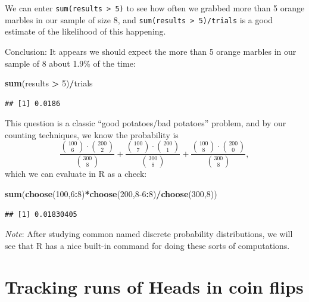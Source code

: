 \documentclass[
]{book}
\newenvironment{Shaded}{\begin{snugshade}}{\end{snugshade}}
\newcommand{\DecValTok}[1]{\textcolor[rgb]{0.00,0.00,0.81}{#1}}
\newcommand{\FunctionTok}[1]{\textcolor[rgb]{0.13,0.29,0.53}{\textbf{#1}}}
\newcommand{\NormalTok}[1]{#1}
\newcommand{\SpecialCharTok}[1]{\textcolor[rgb]{0.81,0.36,0.00}{\textbf{#1}}}
\theoremstyle{definition}
\theoremstyle{definition}
\theoremstyle{definition}
\theoremstyle{definition}
\theoremstyle{remark}
\begin{document}
We can enter \texttt{sum(results\ \textgreater{}\ 5)} to see how often we grabbed more than 5 orange marbles in our sample of size 8, and \texttt{sum(results\ \textgreater{}\ 5)/trials} is a good estimate of the likelihood of this happening.

Conclusion: It appears we should expect the more than 5 orange marbles in our sample of 8 about 1.9\% of the time:

\begin{Shaded}
\begin{Highlighting}[]
\FunctionTok{sum}\NormalTok{(results }\SpecialCharTok{\textgreater{}} \DecValTok{5}\NormalTok{)}\SpecialCharTok{/}\NormalTok{trials}
\end{Highlighting}
\end{Shaded}

\begin{verbatim}
## [1] 0.0186
\end{verbatim}

This question is a classic ``good potatoes/bad potatoes'' problem, and by our counting techniques, we know the probability is \[\frac{\binom{100}{6}\cdot\binom{200}{2}}{\binom{300}{8}}+
\frac{\binom{100}{7}\cdot\binom{200}{1}}{\binom{300}{8}}+
\frac{\binom{100}{8}\cdot\binom{200}{0}}{\binom{300}{8}},\]
which we can evaluate in R as a check:

\begin{Shaded}
\begin{Highlighting}[]
\FunctionTok{sum}\NormalTok{(}\FunctionTok{choose}\NormalTok{(}\DecValTok{100}\NormalTok{,}\DecValTok{6}\SpecialCharTok{:}\DecValTok{8}\NormalTok{)}\SpecialCharTok{*}\FunctionTok{choose}\NormalTok{(}\DecValTok{200}\NormalTok{,}\DecValTok{8{-}6}\SpecialCharTok{:}\DecValTok{8}\NormalTok{)}\SpecialCharTok{/}\FunctionTok{choose}\NormalTok{(}\DecValTok{300}\NormalTok{,}\DecValTok{8}\NormalTok{))}
\end{Highlighting}
\end{Shaded}

\begin{verbatim}
## [1] 0.01830405
\end{verbatim}

\emph{Note}: After studying common named discrete probability distributions, we will see that R has a nice built-in command for doing these sorts of computations.

\section{Tracking runs of Heads in coin flips}\label{flip-coin-R}
\end{document}
